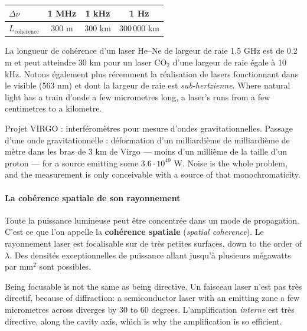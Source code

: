 \begin{center}
  \begin{tabular}{lccc}
    \toprule
    $\Delta\nu$ & 1 MHz & 1 kHz & 1 Hz \\
    \midrule
    $L_{\text{coherence}}$ & 300 m & 300 km & 300\,000 km \\
    \bottomrule
  \end{tabular}
\end{center}

\begin{example}
  La longueur de cohérence d'un laser He--Ne de largeur de raie 1.5 GHz est de
  0.2 m et peut atteindre 30 km pour un laser CO$_2$ d'une largeur de raie égale
  à 10 kHz. Notons également plus récemment la réalisation de lasers
  fonctionnant dans le visible (563 nm) et dont la largeur de raie est
  \emph{sub-hertzienne}. Where natural light has a train d'onde a few
  micrometres long, a laser's runs from a few centimetres to a kilometre.
\end{example}

\begin{example}[VIRGO]
  Projet VIRGO : interféromètres pour mesure d'ondes gravitationnelles. Passage
  d'une onde gravitationnelle : déformation d'un milliardième de milliardième de
  mètre dans les bras de 3 km de Virgo --- moins d'un millième de la taille d'un
  proton --- for a source emitting some $3.6\cdot10^{49}$ W. Noise is the whole
  problem, and the measurement is only conceivable with a source of that
  monochromaticity.
\end{example}

\paragraph{La cohérence spatiale de son rayonnement}
Toute la puissance lumineuse peut être concentrée dans un mode de propagation.
C'est ce que l'on appelle la \textbf{cohérence spatiale} (\textit{spatial
coherence}). Le rayonnement laser est focalisable sur de très petites surfaces,
down to the order of $\lambda$. Des densités exceptionnelles de puissance allant
jusqu'à plusieurs mégawatts par mm$^2$ sont possibles.

\begin{remark}
  Being focusable is not the same as being directive. Un faisceau laser n'est
  pas très directif, because of diffraction: a semiconductor laser with an
  emitting zone a few micrometres across diverges by 30 to 60 degrees.
  L'amplification \emph{interne} est très directive, along the cavity axis,
  which is why the amplification is so efficient.
\end{remark}

